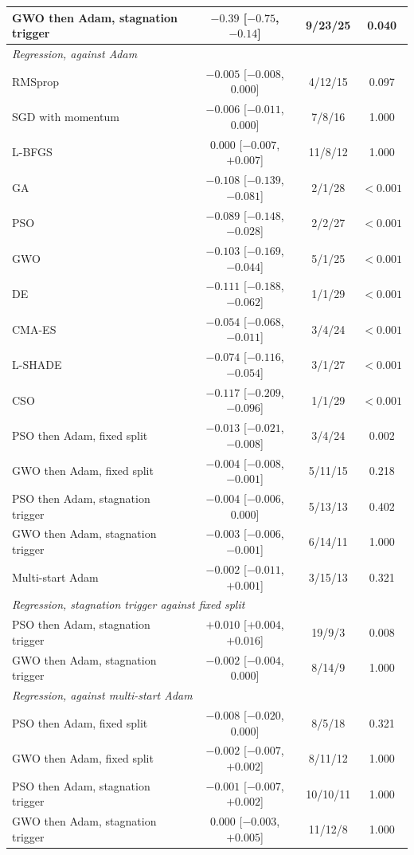 \begin{tabular}{lccc}
GWO then Adam, stagnation trigger & $-0.39$ [$-0.75$, $-0.14$] & 9/23/25 & 0.040 \\
\midrule
\multicolumn{4}{l}{\emph{Regression, against Adam}} \\
RMSprop & $-0.005$ [$-0.008$, $0.000$] & 4/12/15 & 0.097 \\
SGD with momentum & $-0.006$ [$-0.011$, $0.000$] & 7/8/16 & 1.000 \\
L-BFGS & $0.000$ [$-0.007$, $+0.007$] & 11/8/12 & 1.000 \\
GA & $-0.108$ [$-0.139$, $-0.081$] & 2/1/28 & $<0.001$ \\
PSO & $-0.089$ [$-0.148$, $-0.028$] & 2/2/27 & $<0.001$ \\
GWO & $-0.103$ [$-0.169$, $-0.044$] & 5/1/25 & $<0.001$ \\
DE & $-0.111$ [$-0.188$, $-0.062$] & 1/1/29 & $<0.001$ \\
CMA-ES & $-0.054$ [$-0.068$, $-0.011$] & 3/4/24 & $<0.001$ \\
L-SHADE & $-0.074$ [$-0.116$, $-0.054$] & 3/1/27 & $<0.001$ \\
CSO & $-0.117$ [$-0.209$, $-0.096$] & 1/1/29 & $<0.001$ \\
PSO then Adam, fixed split & $-0.013$ [$-0.021$, $-0.008$] & 3/4/24 & 0.002 \\
GWO then Adam, fixed split & $-0.004$ [$-0.008$, $-0.001$] & 5/11/15 & 0.218 \\
PSO then Adam, stagnation trigger & $-0.004$ [$-0.006$, $0.000$] & 5/13/13 & 0.402 \\
GWO then Adam, stagnation trigger & $-0.003$ [$-0.006$, $-0.001$] & 6/14/11 & 1.000 \\
Multi-start Adam & $-0.002$ [$-0.011$, $+0.001$] & 3/15/13 & 0.321 \\
\midrule
\multicolumn{4}{l}{\emph{Regression, stagnation trigger against fixed split}} \\
PSO then Adam, stagnation trigger & $+0.010$ [$+0.004$, $+0.016$] & 19/9/3 & 0.008 \\
GWO then Adam, stagnation trigger & $-0.002$ [$-0.004$, $0.000$] & 8/14/9 & 1.000 \\
\midrule
\multicolumn{4}{l}{\emph{Regression, against multi-start Adam}} \\
PSO then Adam, fixed split & $-0.008$ [$-0.020$, $0.000$] & 8/5/18 & 0.321 \\
GWO then Adam, fixed split & $-0.002$ [$-0.007$, $+0.002$] & 8/11/12 & 1.000 \\
PSO then Adam, stagnation trigger & $-0.001$ [$-0.007$, $+0.002$] & 10/10/11 & 1.000 \\
GWO then Adam, stagnation trigger & $0.000$ [$-0.003$, $+0.005$] & 11/12/8 & 1.000 \\
\bottomrule
\end{tabular}
